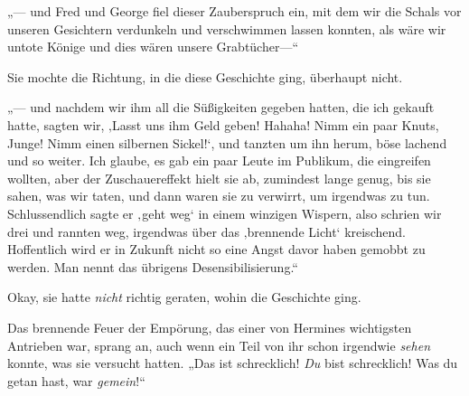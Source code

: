 „— und Fred und George fiel dieser Zauberspruch ein, mit dem wir die Schals vor unseren Gesichtern verdunkeln und verschwimmen lassen konnten, als wäre wir untote Könige und dies wären unsere Grabtücher—“

Sie mochte die Richtung, in die diese Geschichte ging, überhaupt nicht.

„— und nachdem wir ihm all die Süßigkeiten gegeben hatten, die ich gekauft hatte, sagten wir, ‚Lasst uns ihm Geld geben! Hahaha! Nimm ein paar Knuts, Junge! Nimm einen silbernen Sickel!‘, und tanzten um ihn herum, böse lachend und so weiter. Ich glaube, es gab ein paar Leute im Publikum, die eingreifen wollten, aber der Zuschauereffekt hielt sie ab, zumindest lange genug, bis sie sahen, was wir taten, und dann waren sie zu verwirrt, um irgendwas zu tun. Schlussendlich sagte er ‚geht weg‘ in einem winzigen Wispern, also schrien wir drei und rannten weg, irgendwas über das ‚brennende Licht‘ kreischend. Hoffentlich wird er in Zukunft nicht so eine Angst davor haben gemobbt zu werden. Man nennt das übrigens Desensibilisierung.“

Okay, sie hatte \emph{nicht} richtig geraten, wohin die Geschichte ging.

Das brennende Feuer der Empörung, das einer von Hermines wichtigsten Antrieben war, sprang an, auch wenn ein Teil von ihr schon irgendwie \emph{sehen} konnte, was sie versucht hatten. „Das ist schrecklich! \emph{Du} bist schrecklich! Was du getan hast, war \emph{gemein}!“


